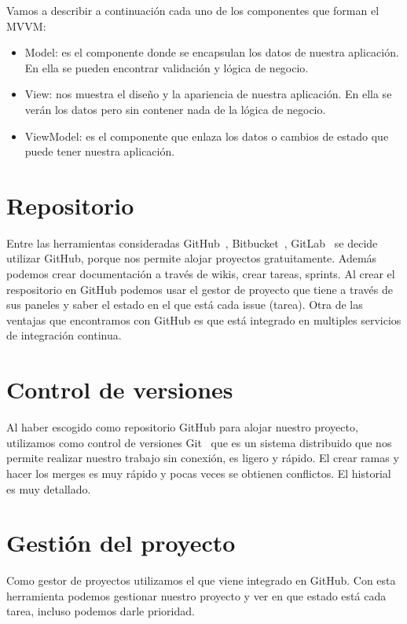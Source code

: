 Vamos a describir a continuación cada uno de los componentes que forman el MVVM:
\begin{itemize}
	\item Model: es el componente donde se encapsulan los datos de nuestra aplicación. En ella se pueden encontrar validación y lógica de negocio.
	\item View: nos muestra el diseño y la apariencia de nuestra aplicación. En ella se verán los datos pero sin contener nada de la lógica de negocio.
	\item ViewModel: es el componente que enlaza los datos o cambios de estado que puede tener nuestra aplicación.
\end{itemize}


\section{Repositorio}
Entre las herramientas consideradas GitHub~\cite{github}, Bitbucket~\cite{bitbucket}, GitLab~\cite{wiki:gitlab} se decide utilizar GitHub, porque nos permite alojar proyectos gratuitamente. Además podemos crear documentación a través de wikis, crear tareas, sprints.
Al crear el respositorio en GitHub podemos usar el gestor de proyecto que tiene a través de sus paneles y saber el estado en el que está cada issue (tarea).
Otra de las ventajas que encontramos con GitHub es que está integrado en multiples servicios de integración continua.

\section{Control de versiones}
Al haber escogido como repositorio GitHub para alojar nuestro proyecto, utilizamos como control de versiones Git~\cite{wiki:git} que es un sistema distribuido que nos permite realizar nuestro trabajo sin conexión, es ligero y rápido.
El crear ramas y hacer los merges es muy rápido y pocas veces se obtienen conflictos.
El historial es muy detallado.

\section{Gestión del proyecto}
Como gestor de proyectos utilizamos el que viene integrado en GitHub. Con esta herramienta podemos gestionar nuestro proyecto y ver en que estado está cada tarea, incluso podemos darle prioridad.

